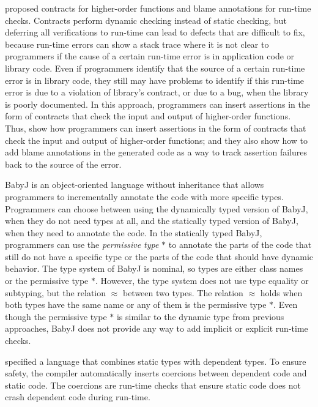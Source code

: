 \documentclass[preprint]{sig-alternate}
\begin{document}
\citet{findler2002chf} proposed contracts for higher-order functions
and blame annotations for run-time checks.
Contracts perform dynamic checking instead of static checking,
but deferring all verifications to run-time can lead to defects
that are difficult to fix, because run-time errors can show a
stack trace where it is not clear to programmers if the cause of a
certain run-time error is in application code or library code.
Even if programmers identify that the source of a certain run-time
error is in library code, they still may have problems to identify
if this run-time error is due to a violation of library's contract,
or due to a bug, when the library is poorly documented.
In this approach, programmers can insert assertions in the form of
contracts that check the input and output of higher-order functions.
Thus, \citet{findler2002chf} show how programmers can insert
assertions in the form of contracts that check the input and output
of higher-order functions; and they also show how to add blame
annotations in the generated code as a way to track assertion
failures back to the source of the error.

BabyJ \citep{anderson2002babyj} is an object-oriented language
without inheritance that allows programmers to incrementally annotate
the code with more specific types.
Programmers can choose between using the dynamically typed version
of BabyJ, when they do not need types at all, and the statically
typed version of BabyJ, when they need to annotate the code.
In the statically typed BabyJ, programmers can use the
\textit{permissive type} $*$ to annotate the parts of the code that
still do not have a specific type or the parts of the code that should
have dynamic behavior.
The type system of BabyJ is nominal, so types are either class names
or the permissive type $*$.
However, the type system does not use type equality or subtyping,
but the relation $\approx$ between two types.
The relation $\approx$ holds when both types have the same name or
any of them is the permissive type $*$.
Even though the permissive type $*$ is similar to the dynamic type
from previous approaches, BabyJ does not provide any way to add
implicit or explicit run-time checks.

\citet{ou2004dtd} specified a language that combines static types
with dependent types.
To ensure safety, the compiler automatically inserts coercions
between dependent code and static code.
The coercions are run-time checks that ensure static code does not
crash dependent code during run-time.
\end{document}
